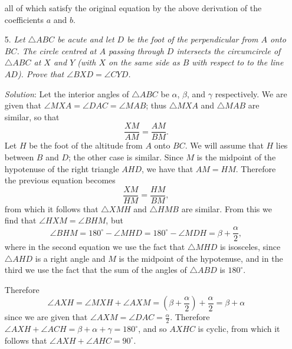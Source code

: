 \documentclass{article}
\begin{document}
\begin{enumerate}
all of which satisfy the original equation by the above derivation of the coefficients $a$ and $b$.


\item[5.] %
\textit{Let $\triangle ABC$ be acute and let $D$ be the foot of the perpendicular from $A$ onto $BC$.
The circle centred at $A$ passing through $D$ intersects the circumcircle of $\triangle ABC$ at $X$ and $Y$ (with $X$ on the same side as $B$ with respect to to the line $AD$).
Prove that $\angle BXD = \angle CYD$.}

\textit{Solution}:
Let the interior angles of $\triangle ABC$ be $\alpha$, $\beta$, and $\gamma$ respectively.
We are given that $\angle MXA = \angle DAC = \angle MAB$; thus $\triangle MXA$ and $\triangle MAB$ are similar, so that
\[ \frac{XM}{AM} = \frac{AM}{BM}. \]
Let $H$ be the foot of the altitude from $A$ onto $BC$.
We will assume that $H$ lies between $B$ and $D$; the other case is similar.
Since $M$ is the midpoint of the hypotenuse of the right triangle $AHD$, we have that $AM = HM$.
Therefore the previous equation becomes
\[ \frac{XM}{HM} = \frac{HM}{BM}, \]
from which it follows that $\triangle XMH$ and $\triangle HMB$ are similar.
From this we find that $\angle HXM = \angle BHM$, but
\[ \angle BHM = 180^\circ -\angle MHD = 180^\circ -\angle MDH = \beta +\frac{\alpha}{2}, \]
where in the second equation we use the fact that $\triangle MHD$ is isosceles, since $\triangle AHD$ is a right angle and $M$ is the midpoint of the hypotenuse, and in the third we use the fact that the sum of the angles of $\triangle ABD$ is $180^\circ$.

Therefore
\[ \angle AXH = \angle MXH +\angle AXM = \left(\beta+\frac{\alpha}{2}\right) +\frac{\alpha}{2} = \beta +\alpha \]
since we are given that $\angle AXM = \angle DAC = \frac{\alpha}{2}$.
Therefore $\angle AXH +\angle ACH = \beta +\alpha +\gamma = 180^\circ$, and so $AXHC$ is cyclic, from which it follows that $\angle AXH +\angle AHC = 90^\circ$.


\end{enumerate}
\end{document}
